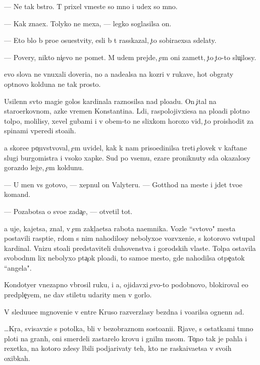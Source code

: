 \documentclass[10pt]{book}
\begin{document}
— Ne tak b{\yi}stro. T{\yi} prixel vmeste so mno{\y} i u{\y}dex so mno{\y}.

— Kak zna{\y}ex. Tolyko ne mexa{\y}, — legko soglasilsa on.

— Eto b{\yi}lo b{\yi} pro{\x}e osu{\x}estvity, {\y}esli b{\yi} t{\yi} rasskazal, {\c}to sobira{\y}exsa sdelaty.

— Povery, nikto ni{\c}evo ne po{\y}met. M{\yi} u{\y}dem prejde, {\c}em oni zamet{\ia}t, {\c}to {\c}to-to slu{\c}ilosy.

{\Y}evo slova ne vnuxali doveri{\y}a, no {\y}a nade{\y}alsa na koz{\yi}ri v rukave, hot{\ia} ob{\yi}graty op{\yi}tnovo kolduna ne tak prosto.

Usilenn{\yi}{\y} sv{\ia}to{\y} magi{\y}e{\y} golos kardinala raznosilsa nad plo{\x}ad{\y}u. On {\c}ital na staro{\q}erkovnom, {\y}az{\yi}ke vremen Konstantina. L{\iu}di, raspolojivxi{\y}esa na plo{\x}adi plotno{\y} tolpo{\y}, molilisy, xevel{\ia} gubami i v ob{\x}em-to ne slixkom horoxo vid{\ia}, {\c}to proishodit za spinami vperedi sto{\y}a{\x}ih.

{\Y}a skore{\y}e po{\c}uvstvoval, {\c}em uvidel, kak k nam priso{\y}edinilsa treti{\y} {\c}elovek v kaftane slugi burgomistra i v{\yi}soko{\y} xapke. Sud{\ia} po vsemu, {\C}ezare proniknuty s{\iu}da okazalosy gorazdo leg{\c}e, {\c}em koldunu.

— U men{\ia} vs{\e} gotovo, — xepnul on Valyteru. — Gotthod na meste i jdet tvo{\y}e{\y} komand{\yi}.

— Pozabotsa o svo{\y}e{\y} zada{\c}e, — otvetil tot.

{\Y}a uje, kajetsa, znal, v {\c}em zakl{\iu}{\c}a{\y}etsa rabota na{\y}emnika. Vozle ``sv{\ia}tovo" mesta postavili rasp{\ia}ti{\y}e, r{\ia}dom s nim nahodilosy nebolyxo{\y}e vozv{\yi}xeni{\y}e, s kotorovo v{\yi}stupal kardinal. Vnizu sto{\y}ali predstaviteli duhovenstva i gorodskih vlaste{\y}. Tolpa ostavila svobodn{\yi}m lix nebolyxo{\y} p{\ia}ta{\c}ok plo{\x}adi, to samo{\y}e mesto, gde nahodilsa otpe{\c}atok ``angela".

Kondotyer vnezapno v{\yi}brosil ruku, i {\y}a, ojidavxi{\y} {\c}evo-to podobnovo, blokiroval {\y}e{\y}o predple{\c}yem, ne dav stiletu udarity men{\ia} v gorlo.

V sledu{\y}u{\x}e{\y}e mgnoveni{\y}e v {\q}entre Kruso razverzlasy bezdna i vo{\q}arilsa ognenn{\yi}{\y} ad.



…Kr{\iu}{\c}{\y}a, svisavxi{\y}e s potolka, b{\yi}li v bezobraznom sosto{\y}ani{\y}i. Rjav{\yi}{\y}e, s ostatkami t{\e}mno{\y} ploti na gran{\ia}h, oni smerdeli zastarelo{\y} krov{\y}u i gnil{\yi}m m{\ia}som. To{\c}no tak je pahla i rexetka, na kotoro{\y} zdesy l{\iu}bili podjarivaty teh, kto ne raska{\y}iva{\y}etsa v svo{\y}ih oxibkah.
\end{document}

